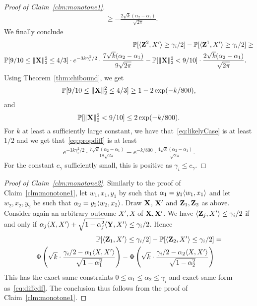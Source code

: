 \begin{proof}[Proof of Claim~\ref{clm:monotone1}]
\begin{align*}
    &\geq -\frac{2 \sqrt{k} (\alpha_2-\alpha_1)}{\sqrt{2 \pi}}.
\end{align*}
We finally conclude
\begin{align}
    \mathbb{P}[\langle\mathbf{Z}^2,X'\rangle\geq \gamma_i/2] - \mathbb{P}[\langle\mathbf{Z}^1,X'\rangle\geq \gamma_i/2] &\geq \nonumber\\
    \mathbb{P}[9/10 \leq \|\mathbf{X}\|_2^2 \leq 4/3] \cdot e^{- 3k\gamma_i^2/2} \cdot \frac{7 \sqrt{k}(\alpha_2-\alpha_1)}{9 \sqrt{2 \pi}} - \mathbb{P}[\|\mathbf{X}\|_2^2 < 9/10] \cdot \frac{2 \sqrt{k} (\alpha_2-\alpha_1)}{\sqrt{2 \pi}}.\label{eq:propdiff}
\end{align}
Using Theorem~\ref{thm:chibound}, we get
\begin{align}
\mathbb{P}[9/10 \leq \|\mathbf{X}\|_2^2 \leq 4/3] \geq 1-2\exp(-k/800), \label{eq:likelyCase}
\end{align}
and
\[
\mathbb{P}[\|\mathbf{X}\|_2^2 < 9/10] \leq 2\exp(-k/800).
\]
For $k$ at least a sufficiently large constant, we have that~\eqref{eq:likelyCase} is at least $1/2$ and we get that~\eqref{eq:propdiff} is at least
\begin{align*}
    e^{- 3k\gamma_i^2/2} \cdot \frac{7 \sqrt{k}(\alpha_2-\alpha_1)}{18 \sqrt{2 \pi}} - e^{-k/800} \cdot \frac{4 \sqrt{k} (\alpha_2-\alpha_1)}{\sqrt{2 \pi}}.
\end{align*}
For the constant $c_\gamma$ sufficiently small, this is positive as $\gamma_i \leq c_\gamma$.
\end{proof}

\begin{proof}[Proof of Claim~\ref{clm:monotone2}]
Similarly to the proof of Claim~\ref{clm:monotone1}, let $w_1,x_1,y_1$ by such that $\alpha_1 = y_1 \langle w_1,x_1\rangle$ and let $w_2,x_2,y_2$ be such that $\alpha_2 = y_2 \langle w_2,x_2\rangle$. Draw $\mathbf{X}$, $\mathbf{X}'$ and $\mathbf{Z}_1,\mathbf{Z}_2$ as above. Consider again an arbitrary outcome $X',X$ of $\mathbf{X},\mathbf{X}'$. We have $\langle\mathbf{Z}_j,X'\rangle \leq \gamma_i/2$ if and only if $\alpha_j \langle X,X'\rangle + \sqrt{1-\alpha_j^2} \langle\mathbf{Y},X'\rangle \leq \gamma_i/2$. Hence
\begin{align*}
    \mathbb{P}[\langle\mathbf{Z}_1,X'\rangle \leq \gamma_i/2] - \mathbb{P}[\langle\mathbf{Z}_2,X'\rangle \leq \gamma_i/2] &=\\
\Phi\left(\sqrt{k} \cdot \frac{\gamma_i/2-\alpha_1\langle X,X'\rangle}{\sqrt{1-\alpha_1^2}}\right)-\Phi\left(\sqrt{k} \cdot \frac{\gamma_i/2-\alpha_2\langle X,X'\rangle}{\sqrt{1-\alpha_2^2}}\right)
\end{align*}
This has the exact same constraints $0 \leq \alpha_1 \leq \alpha_2 \leq \gamma_i$ and exact same form as~\eqref{eq:diffcdf}. The conclusion thus follows from the proof of Claim~\ref{clm:monotone1}.
\end{proof}

